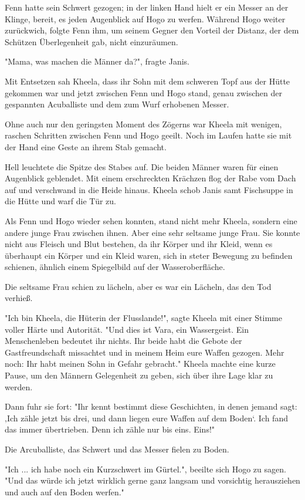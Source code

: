 \documentclass[10pt, a4paper, oneside]{book}
\begin{document}
\begin{multicols}{2}
Fenn hatte sein Schwert gezogen; in der linken Hand hielt er ein Messer an der Klinge, bereit, es jeden Augenblick auf Hogo zu werfen. Während Hogo weiter zurückwich, folgte Fenn ihm, um seinem Gegner den Vorteil der Distanz, der dem Schützen Überlegenheit gab, nicht einzuräumen. 

"Mama, was machen die Männer da?", fragte Janis. 

Mit Entsetzen sah Kheela, dass ihr Sohn mit dem schweren Topf aus der Hütte gekommen war und jetzt zwischen Fenn und Hogo stand, genau zwischen der gespannten Acuballiste und dem zum Wurf erhobenen Messer.\bigskip

Ohne auch nur den geringsten Moment des Zögerns war Kheela mit wenigen, raschen Schritten zwischen Fenn und Hogo geeilt. Noch im Laufen hatte sie mit der Hand eine Geste an ihrem Stab gemacht. 

Hell leuchtete die Spitze des Stabes auf. Die beiden Männer waren für einen Augenblick geblendet. Mit einem erschreckten Krächzen flog der Rabe vom Dach auf und verschwand in die Heide hinaus. Kheela schob Janis samt Fischsuppe in die Hütte und warf die Tür zu. 

Als Fenn und Hogo wieder sehen konnten, stand nicht mehr Kheela, sondern eine andere junge Frau zwischen ihnen. Aber eine sehr seltsame junge Frau. Sie konnte nicht aus Fleisch und Blut bestehen, da ihr Körper und ihr Kleid, wenn es überhaupt ein Körper und ein Kleid waren, sich in steter Bewegung zu befinden schienen, ähnlich einem Spiegelbild auf der Wasseroberfläche. 

Die seltsame Frau schien zu lächeln, aber es war ein Lächeln, das den Tod verhieß. 

"Ich bin Kheela, die Hüterin der Flusslande!", sagte Kheela mit einer Stimme voller Härte und Autorität. "Und dies ist Vara, ein Wassergeist. Ein Menschenleben bedeutet ihr nichts. Ihr beide habt die Gebote der Gastfreundschaft missachtet und in meinem Heim eure Waffen gezogen. Mehr noch: Ihr habt meinen Sohn in Gefahr gebracht." Kheela machte eine kurze Pause, um den Männern Gelegenheit zu geben, sich über ihre Lage klar zu werden. 

Dann fuhr sie fort: "Ihr kennt bestimmt diese Geschichten, in denen jemand sagt: ‚Ich zähle jetzt bis drei, und dann liegen eure Waffen auf dem Boden‘. Ich fand das immer übertrieben. Denn ich zähle nur bis eins. Eins!" 

Die Arcuballiste, das Schwert und das Messer fielen zu Boden. 

"Ich ... ich habe noch ein Kurzschwert im Gürtel.", beeilte sich Hogo zu sagen. "Und das würde ich jetzt wirklich gerne ganz langsam und vorsichtig herausziehen und auch auf den Boden werfen." 


\end{multicols}
\end{document}
